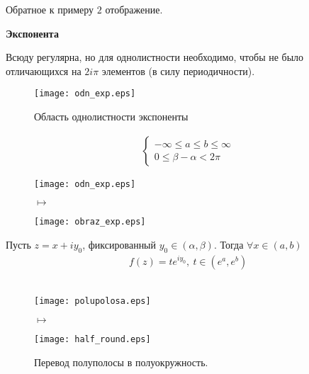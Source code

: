 Обратное к примеру $2$ отображение.
\begin{center}
    \textbf{Экспонента}
\end{center}
Всюду регулярна, но для однолистности необходимо, чтобы не было отличающихся на
$2 i \pi$ элементов (в силу периодичности).
\begin{figure}[h!]
    \centering
    \texttt{[image: odn\_exp.eps]}
    \label{fig:24.4}
    \caption{Область однолистности экспоненты}
\end{figure}
\begin{align*}
  & \begin{cases}
      -\infty \leq a \leq b \leq \infty \\
      0 \leq \beta - \alpha < 2 \pi
  \end{cases}
\end{align*}
\Example
\begin{figure}[h!]
    \begin{minipage}[c]{0.45\textwidth}
        \centering
        \texttt{[image: odn\_exp.eps]}
    \end{minipage}
    \begin{minipage}[c]{0.1\textwidth}
        \centering
        \LARGE{$\mapsto$}
    \end{minipage}
    \begin{minipage}[c]{0.45\textwidth}
        \centering
        \texttt{[image: obraz\_exp.eps]}
    \end{minipage}
    \label{fig:24.5}
\end{figure}
Пусть $z = x+iy_0$, фиксированный $y_0 \in (\alpha,\beta)$. Тогда $\forall x \in
(a,b)$
\begin{align*}
  & f(z) = te^{iy_0}, \ t \in \left( e^{a}, e^{b} \right)
\end{align*}
\Example
~
\\
\begin{figure}[h!]
    \begin{minipage}[c]{0.45\textwidth}
        \centering
        \texttt{[image: polupolosa.eps]}
    \end{minipage}
    \begin{minipage}[c]{0.1\textwidth}
        \centering
        \LARGE{$\mapsto$}
    \end{minipage}
    \begin{minipage}[c]{0.45\textwidth}
        \centering
        \texttt{[image: half\_round.eps]}
    \end{minipage}
    \label{fig:24.6}
    \caption{Перевод полуполосы в полуокружность.}
\end{figure}
